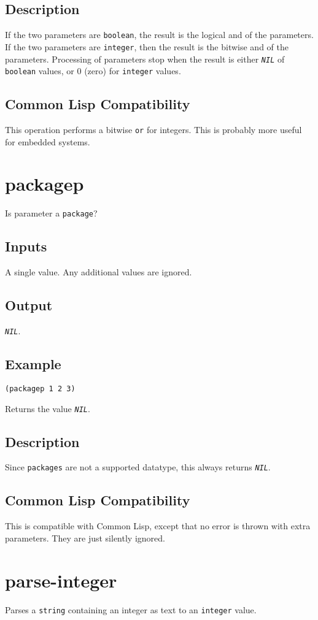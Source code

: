 \documentclass[10pt, openany]{book}
\newcommand{\constant}[1]{\emph{\texttt{#1}}}
\newcommand{\keyword}[1]{\texttt{#1}}
\newcommand{\datatype}[1]{\texttt{#1}}
\newcommand{\cl}{Common Lisp}
\begin{document}
\subsection{Description}
If the two parameters are \datatype{boolean}, the result is the logical and of the parameters.  If the two parameters are \datatype{integer}, then the result is the bitwise and of the parameters.  Processing of parameters stop when the result is either \constant{NIL} of \datatype{boolean} values, or 0 (zero) for \datatype{integer} values.
\subsection{Common Lisp Compatibility}
This operation performs a bitwise \keyword{or} for integers.  This is probably more useful for embedded systems.

\section{packagep}
Is parameter a \datatype{package}?
\subsection{Inputs}
A single value.  Any additional values are ignored.
\subsection{Output}
\constant{NIL}.
\subsection{Example}
\begin{lstlisting}
(packagep 1 2 3)
\end{lstlisting}
Returns the value \constant{NIL}.
\subsection{Description}
Since \datatype{packages} are not a supported datatype, this always returns \constant{NIL}.
\subsection{Common Lisp Compatibility}
This is compatible with \cl, except that no error is thrown with extra parameters.  They are just silently ignored.
\\
\section{parse-integer}
Parses a \datatype{string} containing an integer as text to an \datatype{integer} value.
\end{document}
